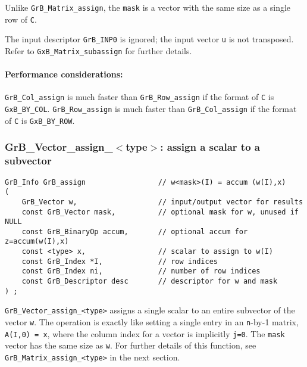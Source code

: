 \documentclass[12pt]{article}
\begin{document}
Unlike \verb'GrB_Matrix_assign', the \verb'mask' is a vector with the same size
as a single row of \verb'C'.

The input descriptor \verb'GrB_INP0' is ignored; the input vector \verb'u' is
not transposed.  Refer to \verb'GxB_Matrix_subassign' for further details.

\paragraph{\bf Performance considerations:} %
\verb'GrB_Col_assign' is much faster than \verb'GrB_Row_assign' if the format
of \verb'C' is \verb'GxB_BY_COL'.  \verb'GrB_Row_assign' is much faster than
\verb'GrB_Col_assign' if the format of \verb'C' is \verb'GxB_BY_ROW'.

\newpage
\subsubsection{{\sf GrB\_Vector\_assign\_$<$type$>$:} assign a scalar to a subvector}
\label{assign_vector_scalar}

\begin{mdframed}[userdefinedwidth=6in]
{\footnotesize
\begin{verbatim}
GrB_Info GrB_assign                 // w<mask>(I) = accum (w(I),x)
(
    GrB_Vector w,                   // input/output vector for results
    const GrB_Vector mask,          // optional mask for w, unused if NULL
    const GrB_BinaryOp accum,       // optional accum for z=accum(w(I),x)
    const <type> x,                 // scalar to assign to w(I)
    const GrB_Index *I,             // row indices
    const GrB_Index ni,             // number of row indices
    const GrB_Descriptor desc       // descriptor for w and mask
) ;
\end{verbatim} } \end{mdframed}

\verb'GrB_Vector_assign_<type>' assigns a single scalar to an entire subvector
of the vector \verb'w'.  The operation is exactly like setting a single entry
in an \verb'n'-by-1 matrix, \verb'A(I,0) = x', where the column index for a
vector is implicitly \verb'j=0'.  The \verb'mask' vector has the same size as
\verb'w'.  For further details of this function, see
\verb'GrB_Matrix_assign_<type>' in the next section.
\end{document}
